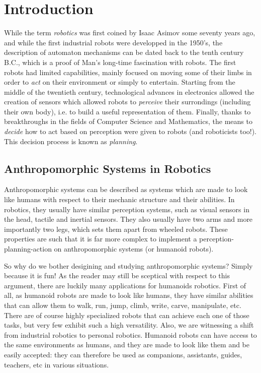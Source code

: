 \chapter{Introduction}
\label{chap:chap0}

While the term \emph{robotics} was first coined by Isaac Asimov some
seventy years ago, and while the first industrial robots were
developped in the 1950's, the description of automaton mechanisms can
be dated back to the tenth century B.C., which is a proof of Man's
long-time fascination with robots. The first robots had limited
capabilities, mainly focused on moving some of their limbs in order to
\emph{act} on their environment or simply to entertain. Starting from
the middle of the twentieth century, technological advances in
electronics allowed the creation of sensors which allowed robots to
\emph{perceive} their surrondings (including their own body), i.e. to
build a useful representation of them. Finally, thanks to
breakthroughs in the fields of Computer Science and Mathematics, the
means to \emph{decide} how to act based on perception were given to
robots (and roboticists too!). This decision process is known as
\emph{planning}.

\section{Anthropomorphic Systems in Robotics}

Anthropomorphic systems can be described as systems which are made to
look like humans with respect to their mechanic structure and their
abilities. In robotics, they usually have similar perception systems,
such as visual sensors in the head, tactile and inertial sensors. They
also usually have two arms and more importantly two legs, which sets
them apart from wheeled robots. These properties are such that it is
far more complex to implement a perception-planning-action on
anthropomorphic systems (or humanoid robots).

So why do we bother desigining and studying anthropomorphic systems?
Simply because it is fun! As the reader may still be sceptical with
respect to this argument, there are luckily many applications for
humanoids robotics. First of all, as humanoid robots are made to look
like humans, they have similar abilities that can allow them to walk,
run, jump, climb, write, carve, manipulate, etc. There are of course
highly specialized robots that can achieve each one of those tasks,
but very few exhibit such a high versatility. Also, we are witnessing
a shift from industrial robotics to personal robotics. Humanoid robots
can have access to the same environments as humans, and they are made
to look like them and be easily accepted: they can therefore be used
as companions, assistants, guides, teachers, etc in various
situations.


